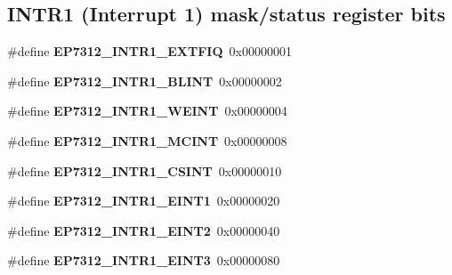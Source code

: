 \subsection*{I\+N\+T\+R1 (Interrupt 1) mask/status register bits}
\begin{DoxyCompactItemize}
\item 
\mbox{\label{group__edb7312__registers_gac4c540eec96b06ea37a17bb2c86ee1f0}} 
\#define {\bfseries E\+P7312\+\_\+\+I\+N\+T\+R1\+\_\+\+E\+X\+T\+F\+IQ}~0x00000001
\item 
\mbox{\label{group__edb7312__registers_ga2477ca5f50a2c9222a6a00d0a5c70c8c}} 
\#define {\bfseries E\+P7312\+\_\+\+I\+N\+T\+R1\+\_\+\+B\+L\+I\+NT}~0x00000002
\item 
\mbox{\label{group__edb7312__registers_gaad79f47190c32bdbd7fbe30bae2fcfff}} 
\#define {\bfseries E\+P7312\+\_\+\+I\+N\+T\+R1\+\_\+\+W\+E\+I\+NT}~0x00000004
\item 
\mbox{\label{group__edb7312__registers_ga2f52a677f65517c7115959ef86c5ad71}} 
\#define {\bfseries E\+P7312\+\_\+\+I\+N\+T\+R1\+\_\+\+M\+C\+I\+NT}~0x00000008
\item 
\mbox{\label{group__edb7312__registers_ga847295d29f222ac5acf2bd0827e436d7}} 
\#define {\bfseries E\+P7312\+\_\+\+I\+N\+T\+R1\+\_\+\+C\+S\+I\+NT}~0x00000010
\item 
\mbox{\label{group__edb7312__registers_ga917d7b00a7183e8b218a6cff62c49d10}} 
\#define {\bfseries E\+P7312\+\_\+\+I\+N\+T\+R1\+\_\+\+E\+I\+N\+T1}~0x00000020
\item 
\mbox{\label{group__edb7312__registers_ga77b8293462141c5ab53f9d4e68826396}} 
\#define {\bfseries E\+P7312\+\_\+\+I\+N\+T\+R1\+\_\+\+E\+I\+N\+T2}~0x00000040
\item 
\mbox{\label{group__edb7312__registers_ga43bbc9c0847f8ba7431938238ae7aba1}} 
\#define {\bfseries E\+P7312\+\_\+\+I\+N\+T\+R1\+\_\+\+E\+I\+N\+T3}~0x00000080
\item 
\mbox{\label{group__edb7312__registers_gae25f9c15405182000b608c8be616b12b}} 

\end{DoxyCompactItemize}
